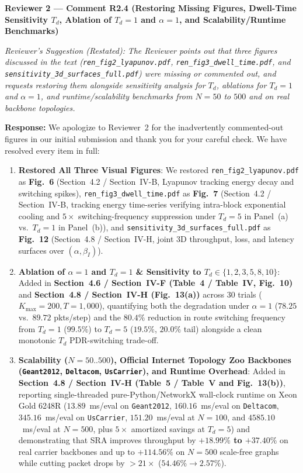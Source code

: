 \documentclass[11pt,a4paper]{article}
\newcommand{\cbox}[2]{%
  \vspace{0.6em}\noindent\textbf{#1}\par\smallskip
  \noindent\textit{Reviewer's Suggestion (Restated):} \textit{#2}\par\smallskip
}
\begin{document}
\hrulefill

\cbox{Reviewer 2 --- Comment R2.4 (Restoring Missing Figures, Dwell-Time Sensitivity $T_d$, Ablation of $T_d=1$ and $\alpha=1$, and Scalability/Runtime Benchmarks)}{The Reviewer points out that three figures discussed in the text (\texttt{ren\_fig2\_lyapunov.pdf}, \texttt{ren\_fig3\_\allowbreak dwell\_time.pdf}, and \texttt{sensitivity\_3d\_\allowbreak surfaces\_full.pdf}) were missing or commented out, and requests restoring them alongside sensitivity analysis for $T_d$, ablations for $T_d=1$ and $\alpha=1$, and runtime/scalability benchmarks from $N=50$ to $500$ and on real backbone topologies.}

\noindent\textbf{Response:} We apologize to Reviewer~2 for the inadvertently commented-out figures in our initial submission and thank you for your careful check. We have resolved every item in full:
\begin{enumerate}[leftmargin=1.8em]
    \item \textbf{Restored All Three Visual Figures}: We restored \texttt{ren\_fig2\_lyapunov.pdf} as \textbf{Fig.~6} (Section~4.2 / Section~IV-B, Lyapunov tracking energy decay and switching spikes), \texttt{ren\_fig3\_\allowbreak dwell\_time.pdf} as \textbf{Fig.~7} (Section~4.2 / Section~IV-B, tracking energy time-series verifying intra-block exponential cooling and $5\times$ switching-frequency suppression under $T_d=5$ in Panel~(a) vs.\ $T_d=1$ in Panel~(b)), and \texttt{sensitivity\_3d\_\allowbreak surfaces\_full.pdf} as \textbf{Fig.~12} (Section~4.8 / Section~IV-H, joint 3D throughput, loss, and latency surfaces over $(\alpha, \beta_I)$).
    \item \textbf{Ablation of $\alpha=1$ and $T_d=1$ \& Sensitivity to $T_d \in \{1, 2, 3, 5, 8, 10\}$}: Added in \textbf{Section~4.6 / Section~IV-F (Table~4 / Table~IV, Fig.~10)} and \textbf{Section~4.8 / Section~IV-H (Fig.~13(a))} across 30 trials ($K_{\max}=200, T=1{,}000$), quantifying both the degradation under $\alpha=1$ ($78.25$ vs.\ $89.72$ pkts/step) and the $80.4\%$ reduction in route switching frequency from $T_d=1$ ($99.5\%$) to $T_d=5$ ($19.5\%$, $20.0\%$ tail) alongside a clean monotonic $T_d$ PDR-switching trade-off.
    \item \textbf{Scalability ($N=50..500$), Official Internet Topology Zoo Backbones (\texttt{Geant2012}, \texttt{Deltacom}, \texttt{UsCarrier}), and Runtime Overhead}: Added in \textbf{Section~4.8 / Section~IV-H (Table~5 / Table~V and Fig.~13(b))}, reporting single-threaded pure-Python/NetworkX wall-clock runtime on Xeon Gold 6248R ($13.89$~ms/eval on \texttt{Geant2012}, $160.16$~ms/eval on \texttt{Deltacom}, $345.16$~ms/eval on \texttt{UsCarrier}, $151.20$~ms/eval at $N=100$, and $4585.10$~ms/eval at $N=500$, plus $5\times$ amortized savings at $T_d=5$) and demonstrating that SRA improves throughput by \textbf{$+18.99\%$ to $+37.40\%$} on real carrier backbones and up to \textbf{$+114.56\%$} on $N=500$ scale-free graphs while cutting packet drops by $>21\times$ ($54.46\% \to 2.57\%$).
\end{enumerate}
\end{document}
